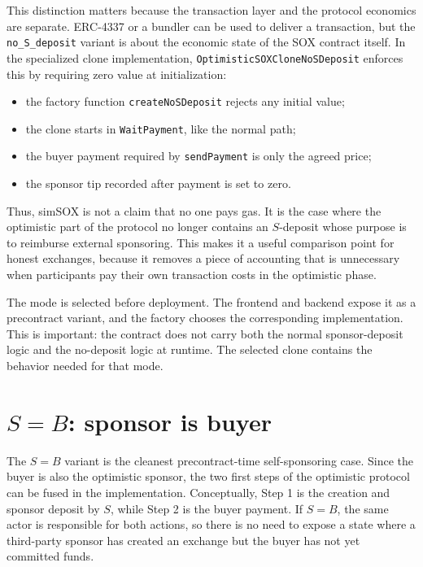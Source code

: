 This distinction matters because the transaction layer and the protocol economics are
separate. ERC-4337 or a bundler can be used to deliver a transaction, but the
\texttt{no\_S\_deposit} variant is about the economic state of the SOX contract itself. In
the specialized clone implementation, \texttt{OptimisticSOXCloneNoSDeposit} enforces this by
requiring zero value at initialization:

\begin{itemize}
  \item the factory function \texttt{createNoSDeposit} rejects any initial value;
  \item the clone starts in \texttt{WaitPayment}, like the normal path;
  \item the buyer payment required by \texttt{sendPayment} is only the agreed price;
  \item the sponsor tip recorded after payment is set to zero.
\end{itemize}

Thus, simSOX is not a claim that no one pays gas. It is the case where the optimistic part of
the protocol no longer contains an \(S\)-deposit whose purpose is to reimburse external
sponsoring. This makes it a useful comparison point for honest exchanges, because it removes
a piece of accounting that is unnecessary when participants pay their own transaction costs
in the optimistic phase.

The mode is selected before deployment. The frontend and backend expose it as a precontract
variant, and the factory chooses the corresponding implementation. This is important: the
contract does not carry both the normal sponsor-deposit logic and the no-deposit logic at
runtime. The selected clone contains the behavior needed for that mode.

\section[S=B: sponsor is buyer]{\(S=B\): sponsor is buyer}

The \(S=B\) variant is the cleanest precontract-time self-sponsoring case. Since the buyer is
also the optimistic sponsor, the two first steps of the optimistic protocol can be fused in
the implementation. Conceptually, Step 1 is the creation and sponsor deposit by \(S\), while
Step 2 is the buyer payment. If \(S=B\), the same actor is responsible for both actions, so
there is no need to expose a state where a third-party sponsor has created an exchange but
the buyer has not yet committed funds.

